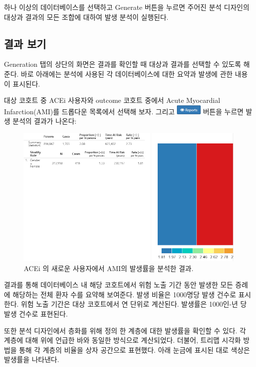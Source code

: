 \documentclass[11pt]{book}
\theoremstyle{definition}
\theoremstyle{definition}
\theoremstyle{definition}
\theoremstyle{remark}
\begin{document}
하나 이상의 데이터베이스를 선택하고 Generate 버튼을 누르면 주어진 분석
디자인의 대상과 결과의 모든 조합에 대하여 발생 분석이 실행된다.

\subsection{결과 보기}\label{-}

Generation 탭의 상단의 화면은 결과를 확인할 때 대상과 결과를 선택할 수
있도록 해준다. 바로 아래에는 분석에 사용된 각 데이터베이스에 대한 요약과
발생에 관한 내용이 표시된다.

대상 코호트 중 ACEi 사용자와 outcome 코호트 중에서 Acute Myocardial
Infarction(AMI)를 드롭다운 목록에서 선택해 보자. 그리고
\includegraphics{images/Characterization/atlasIncidenceReportButton.png}
버튼을 누르면 발생 분석의 결과가 나온다:

\begin{figure}

{\centering \includegraphics[width=1\linewidth]{images/Characterization/atlasIncidenceResults} 

}

\caption{ACEi 의 새로운 사용자에서 AMI의 발생률을 분석한 결과.}\label{fig:atlasIncidenceResults}
\end{figure}

결과를 통해 데이터베이스 내 해당 코호트에서 위험 노출 기간 동안 발생한
모든 증례에 해당하는 전체 환자 수를 요약해 보여준다. 발생 비율은
1000명당 발생 건수로 표시한다. 위험 노출 기간은 대상 코호트에서 연
단위로 계산된다. 발생률은 1000인-년 당 발생 건수로 표현된다.

또한 분석 디자인에서 층화를 위해 정의 한 계층에 대한 발생률을 확인할 수
있다. 각 계층에 대해 위에 언급한 바와 동일한 방식으로 계산되었다.
더불어, 트리맵 시각화 방법을 통해 각 계층의 비율을 상자 공간으로
표현했다. 아래 눈금에 표시된 대로 색상은 발생률을 나타낸다.
\end{document}
